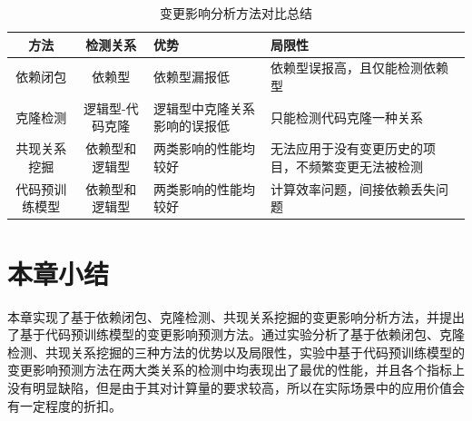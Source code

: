 \begin{table}[htbp]
\caption{变更影响分析方法对比总结}
\label{1_变更影响分析方法对比总结}
\vspace{0.5em}\centering\wuhao
\begin{tabular}{c|c|p{4cm}|p{4cm}}
\toprule
方法& 检测关系 & 优势 & 局限性\\
\midrule
依赖闭包 & 依赖型 & 依赖型漏报低 & 依赖型误报高，且仅能检测依赖型\\
\midrule
克隆检测 & 逻辑型-代码克隆 & 逻辑型中克隆关系影响的误报低 & 只能检测代码克隆一种关系\\
\midrule
共现关系挖掘  & 依赖型和逻辑型 & 两类影响的性能均较好 & 无法应用于没有变更历史的项目，不频繁变更无法被检测 \\
\midrule
代码预训练模型  & 依赖型和逻辑型 & 两类影响的性能均较好 & 计算效率问题，间接依赖丢失问题 \\
\bottomrule
\end{tabular}
\end{table}



\section{本章小结}

本章实现了基于依赖闭包、克隆检测、共现关系挖掘的变更影响分析方法，并提出了基于代码预训练模型的变更影响预测方法。通过实验分析了基于依赖闭包、克隆检测、共现关系挖掘的三种方法的优势以及局限性，实验中基于代码预训练模型的变更影响预测方法在两大类关系的检测中均表现出了最优的性能，并且各个指标上没有明显缺陷，但是由于其对计算量的要求较高，所以在实际场景中的应用价值会有一定程度的折扣。

